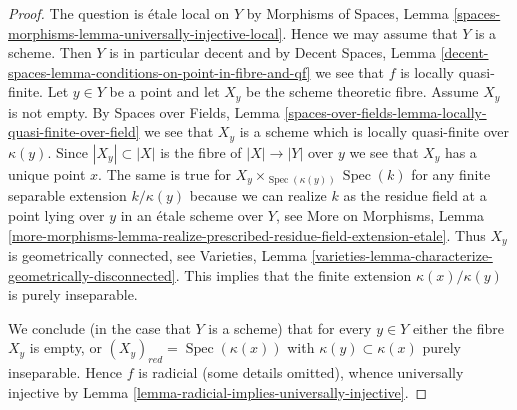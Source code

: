 \documentclass[10pt,a4paper]{amsart}
\theoremstyle{plain}
\theoremstyle{definition}
\theoremstyle{remark}
\numberwithin{equation}{subsection}
\def\Spec{\mathop{\mathrm{Spec}}}
\begin{document}
\begin{proof}
The question is \'etale local on $Y$ by
Morphisms of Spaces, Lemma
\ref{spaces-morphisms-lemma-universally-injective-local}.
Hence we may assume that $Y$ is a scheme.
Then $Y$ is in particular decent and by Decent Spaces, Lemma
\ref{decent-spaces-lemma-conditions-on-point-in-fibre-and-qf}
we see that $f$ is locally quasi-finite.
Let $y \in Y$ be a point and let $X_y$ be the scheme theoretic
fibre. Assume $X_y$ is not empty. By Spaces over Fields, Lemma
\ref{spaces-over-fields-lemma-locally-quasi-finite-over-field}
we see that $X_y$ is a scheme which is locally quasi-finite over
$\kappa(y)$. Since $|X_y| \subset |X|$ is the fibre of $|X| \to |Y|$
over $y$ we see that $X_y$ has a unique point $x$. The same is true
for $X_y \times_{\Spec(\kappa(y))} \Spec(k)$ for any
finite separable extension $k/\kappa(y)$
because we can realize $k$ as the residue field at a point
lying over $y$ in an \'etale scheme over $Y$,
see More on Morphisms, Lemma
\ref{more-morphisms-lemma-realize-prescribed-residue-field-extension-etale}.
Thus $X_y$ is geometrically connected, see
Varieties, Lemma \ref{varieties-lemma-characterize-geometrically-disconnected}.
This implies that the finite extension $\kappa(x)/\kappa(y)$
is purely inseparable.

\medskip\noindent
We conclude (in the case that $Y$ is a scheme)
that for every $y \in Y$ either the fibre $X_y$ is empty,
or $(X_y)_{red} = \Spec(\kappa(x))$ with
$\kappa(y) \subset \kappa(x)$ purely inseparable.
Hence $f$ is radicial (some details omitted), whence universally injective by
Lemma \ref{lemma-radicial-implies-universally-injective}.
\end{proof}
\end{document}
